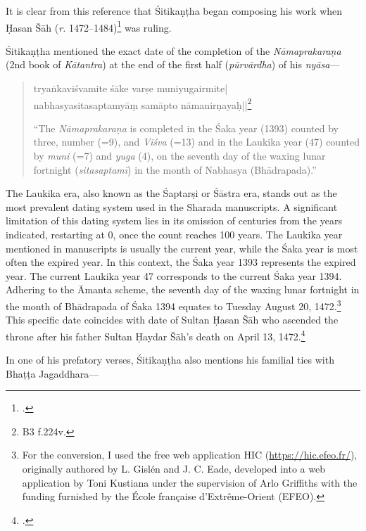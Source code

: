 It is clear from this reference that Śitikaṇṭha began composing his work when Ḥasan Šāh (\emph{r.} 1472--1484)\footcite[109]{Hasan2024} was ruling. 

Śitikaṇṭha mentioned the exact date of the completion of the \emph{Nāmaprakaraṇa} (2nd book of \emph{Kātantra}) at the end of the first half (\emph{pūrvārdha}) of his \emph{\emph{nyāsa}}---

\begin{quote}
	

\textsanskrit{tryaṅkaviśvamite śāke varṣe muniyugairmite|\\
nabhasyasitasaptamyāṃ samāpto nāmanirṇayaḥ||}\footnote{\gls{B3} f.224v.}

“The \emph{Nāmaprakaraṇa} is completed in the Śaka year (1393) counted by three, number (=9), and \emph{Viśva} (=13) and in the Laukika year (47) counted by \emph{muni} (=7) and \emph{yuga} (4), on the seventh day of the waxing lunar fortnight (\emph{sitasaptamī}) in the month of Nabhasya (Bhādrapada).”

\end{quote}
The Laukika era, also known as the Śaptarṣi or Śāstra era, stands out as the most prevalent dating system used in the Sharada manuscripts. A significant limitation of this dating system lies in its omission of centuries from the years indicated, restarting at 0, once the count reaches 100 years. The Laukika year mentioned in manuscripts is usually the current year, while the Śaka year is most often the expired year. In this context, the Śaka year 1393 represents the expired year. The current Laukika year 47 corresponds to the current Śaka year 1394. Adhering to the Āmanta scheme, the seventh day of the waxing lunar fortnight in the month of Bhādrapada of Śaka 1394 equates to Tuesday August 20, 1472.\footnote{For the conversion, I used the free web application HIC (\url{https://hic.efeo.fr/}), originally authored by L. Gislén and J. C. Eade, developed into a web application by Toni Kustiana under the supervision of Arlo Griffiths with the funding furnished by the École française d’Extrême-Orient (EFEO).}
This specific date coincides with date of Sultan Ḥasan Šāh who ascended the throne after his father Sultan Ḥaydar Šāh's death on April 13, 1472.\footcite[108]{Hasan2024} 

In one of his prefatory verses, Śitikaṇṭha also mentions his familial ties with Bhaṭṭa Jagaddhara---


